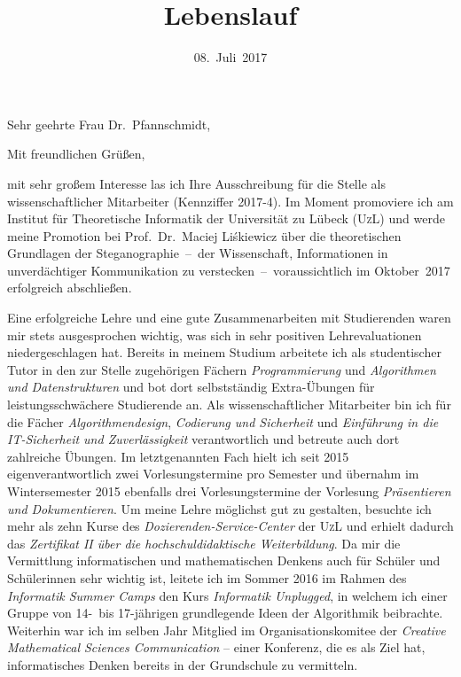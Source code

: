 \documentclass[11pt,a4paper,sans]{moderncv}        %
\title{Lebenslauf}                               %
\begin{document}
\date{08.~Juli~2017}
\opening{Sehr geehrte Frau Dr.~Pfannschmidt,}
\closing{Mit freundlichen Grüßen,}
\makelettertitle
\vspace{-.4cm}
mit sehr großem Interesse las ich Ihre Ausschreibung für die Stelle als 
wissenschaftlicher Mitarbeiter (Kennziffer 2017-4). Im Moment
promoviere ich am Institut für Theoretische Informatik der Universität
zu Lübeck (\textsc{UzL}) und werde meine Promotion bei Prof.~Dr.~Maciej
Liśkiewicz über die theoretischen 
Grundlagen der Steganographie~--~der Wissenschaft, Informationen in
unverdächtiger Kommunikation zu verstecken~--~voraussichtlich im Oktober~2017
erfolgreich abschließen.

Eine erfolgreiche Lehre und eine gute Zusammenarbeiten mit Studierenden
waren mir stets ausgesprochen wichtig, was sich in sehr positiven
Lehrevaluationen niedergeschlagen hat. Bereits in meinem Studium
arbeitete ich als studentischer Tutor in den zur Stelle zugehörigen
Fächern \emph{Programmierung} und \emph{Algorithmen und Datenstrukturen}
und bot dort selbstständig Extra-Übungen für leistungsschwächere
Studierende an.  Als wissenschaftlicher Mitarbeiter bin ich für die
Fächer \emph{Algorithmendesign}, \emph{Codierung und Sicherheit} und
\emph{Einführung in die IT-Sicherheit und Zuverlässigkeit}
verantwortlich und betreute auch dort zahlreiche Übungen. Im
letztgenannten Fach hielt ich seit 2015 eigenverantwortlich zwei
Vorlesungstermine pro Semester und übernahm im Wintersemester 2015 
ebenfalls drei Vorlesungstermine der Vorlesung
\emph{Präsentieren und Dokumentieren}. Um meine Lehre möglichst gut zu
gestalten, besuchte ich mehr als zehn Kurse des
\emph{Dozierenden-Service-Center} der \textsc{UzL} und erhielt dadurch
das \emph{Zertifikat II über die hochschuldidaktische Weiterbildung}. Da
mir die Vermittlung informatischen und mathematischen Denkens auch für
Schüler und Schülerinnen sehr wichtig ist, leitete ich im Sommer 2016 im
Rahmen des \emph{Informatik Summer Camps} den Kurs \emph{Informatik
  Unplugged}, in welchem ich einer Gruppe von 14-~bis 17-jährigen 
grundlegende Ideen der Algorithmik
beibrachte. Weiterhin war ich im selben Jahr Mitglied im
Organisationskomitee der \emph{Creative Mathematical Sciences
  Communication} -- einer Konferenz, die es als Ziel hat, informatisches
Denken bereits in der Grundschule zu vermitteln.
\end{document}
